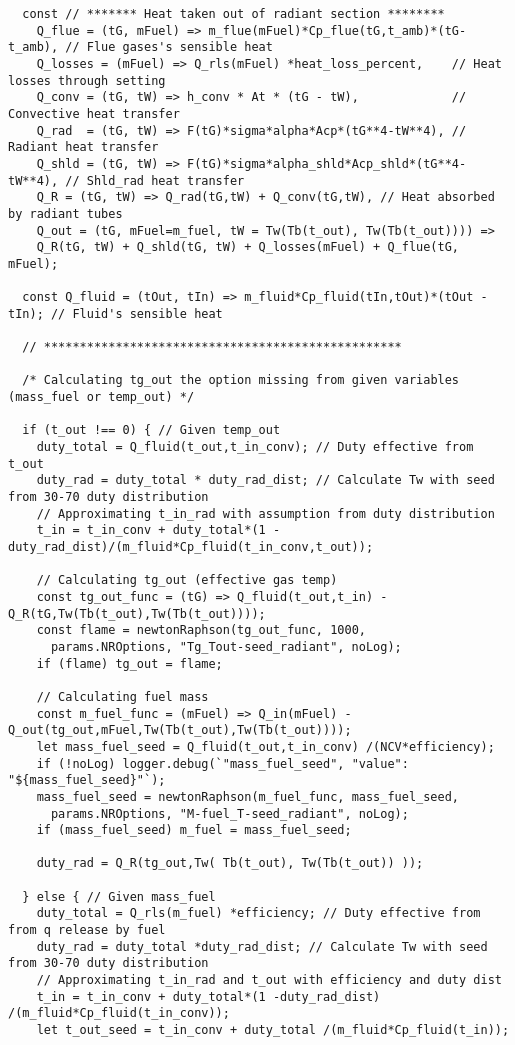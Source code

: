 \begin{verbatim}
  const // ******* Heat taken out of radiant section ********
    Q_flue = (tG, mFuel) => m_flue(mFuel)*Cp_flue(tG,t_amb)*(tG-t_amb), // Flue gases's sensible heat 
    Q_losses = (mFuel) => Q_rls(mFuel) *heat_loss_percent,    // Heat losses through setting
    Q_conv = (tG, tW) => h_conv * At * (tG - tW),             // Convective heat transfer
    Q_rad  = (tG, tW) => F(tG)*sigma*alpha*Acp*(tG**4-tW**4), // Radiant heat transfer
    Q_shld = (tG, tW) => F(tG)*sigma*alpha_shld*Acp_shld*(tG**4-tW**4), // Shld_rad heat transfer
    Q_R = (tG, tW) => Q_rad(tG,tW) + Q_conv(tG,tW), // Heat absorbed by radiant tubes
    Q_out = (tG, mFuel=m_fuel, tW = Tw(Tb(t_out), Tw(Tb(t_out)))) => 
    Q_R(tG, tW) + Q_shld(tG, tW) + Q_losses(mFuel) + Q_flue(tG, mFuel);

  const Q_fluid = (tOut, tIn) => m_fluid*Cp_fluid(tIn,tOut)*(tOut -tIn); // Fluid's sensible heat

  // **************************************************

  /* Calculating tg_out the option missing from given variables (mass_fuel or temp_out) */

  if (t_out !== 0) { // Given temp_out
    duty_total = Q_fluid(t_out,t_in_conv); // Duty effective from t_out
    duty_rad = duty_total * duty_rad_dist; // Calculate Tw with seed from 30-70 duty distribution
    // Approximating t_in_rad with assumption from duty distribution
    t_in = t_in_conv + duty_total*(1 -duty_rad_dist)/(m_fluid*Cp_fluid(t_in_conv,t_out));

    // Calculating tg_out (effective gas temp)
    const tg_out_func = (tG) => Q_fluid(t_out,t_in) -Q_R(tG,Tw(Tb(t_out),Tw(Tb(t_out))));
    const flame = newtonRaphson(tg_out_func, 1000, 
      params.NROptions, "Tg_Tout-seed_radiant", noLog);
    if (flame) tg_out = flame;

    // Calculating fuel mass
    const m_fuel_func = (mFuel) => Q_in(mFuel) -Q_out(tg_out,mFuel,Tw(Tb(t_out),Tw(Tb(t_out))));
    let mass_fuel_seed = Q_fluid(t_out,t_in_conv) /(NCV*efficiency);
    if (!noLog) logger.debug(`"mass_fuel_seed", "value": "${mass_fuel_seed}"`);
    mass_fuel_seed = newtonRaphson(m_fuel_func, mass_fuel_seed,
      params.NROptions, "M-fuel_T-seed_radiant", noLog);
    if (mass_fuel_seed) m_fuel = mass_fuel_seed;

    duty_rad = Q_R(tg_out,Tw( Tb(t_out), Tw(Tb(t_out)) ));

  } else { // Given mass_fuel
    duty_total = Q_rls(m_fuel) *efficiency; // Duty effective from from q release by fuel
    duty_rad = duty_total *duty_rad_dist; // Calculate Tw with seed from 30-70 duty distribution
    // Approximating t_in_rad and t_out with efficiency and duty dist
    t_in = t_in_conv + duty_total*(1 -duty_rad_dist) /(m_fluid*Cp_fluid(t_in_conv));
    let t_out_seed = t_in_conv + duty_total /(m_fluid*Cp_fluid(t_in));


\end{verbatim}
